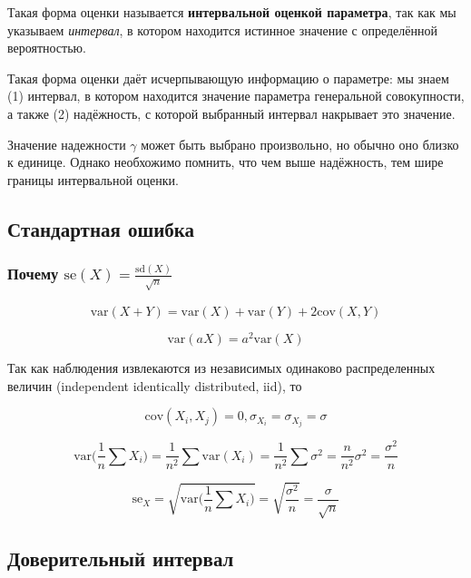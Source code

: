\documentclass[
  letterpaper,
  DIV=11,
  numbers=noendperiod]{scrreprt}
\theoremstyle{definition}
\theoremstyle{remark}
\begin{document}
Такая форма оценки называется \textbf{интервальной оценкой параметра},
так как мы указываем \emph{интервал}, в котором находится истинное
значение с определённой вероятностью.

Такая форма оценки даёт исчерпывающую информацию о параметре: мы знаем
(1) интервал, в котором находится значение параметра генеральной
совокупности, а также (2) надёжность, с которой выбранный интервал
накрывает это значение.

Значение надежности \(\gamma\) может быть выбрано произвольно, но обычно
оно близко к единице. Однако необхожимо помнить, что чем выше
надёжность, тем шире границы интервальной оценки.

\subsection{Стандартная
ошибка}\label{ux441ux442ux430ux43dux434ux430ux440ux442ux43dux430ux44f-ux43eux448ux438ux431ux43aux430}

\subsubsection{\texorpdfstring{Почему
\(\text{se}(X) = \frac{\text{sd}(X)}{\sqrt{n}}\)}{Почему \textbackslash text\{se\}(X) = \textbackslash frac\{\textbackslash text\{sd\}(X)\}\{\textbackslash sqrt\{n\}\}}}\label{ux43fux43eux447ux435ux43cux443-textsex-fractextsdxsqrtn}

\[
\text{var}(X + Y) = \text{var}(X) + \text{var}(Y) + 2 \text{cov}(X, Y)
\]

\[
\text{var}(aX) = a^2 \text{var}(X)
\]

Так как наблюдения извлекаются из независимых одинаково распределенных
величин (independent identically distributed, iid), то

\[
\text{cov}(X_i, X_j) = 0, \sigma_{X_i} = \sigma_{X_j} = \sigma
\]

\[
\text{var}\Big( \frac{1}{n} \sum X_i \Big) = \frac{1}{n^2} \sum \text{var}(X_i) = \frac{1}{n^2} \sum \sigma^2 = \frac{n}{n^2} \sigma^2 = \frac{\sigma^2}{n}
\]

\[
\text{se}_X = \sqrt{ \text{var}\Big( \frac{1}{n} \sum X_i \Big)} = \sqrt{\frac{\sigma^2}{n}} = \frac{\sigma}{\sqrt{n}}
\]

\subsection{Доверительный
интервал}\label{ux434ux43eux432ux435ux440ux438ux442ux435ux43bux44cux43dux44bux439-ux438ux43dux442ux435ux440ux432ux430ux43b}
\end{document}

